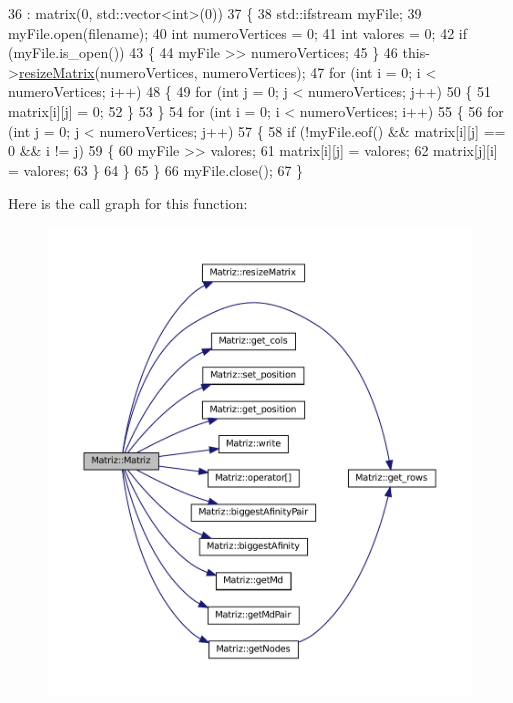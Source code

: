 \begin{DoxyCode}
36                              : matrix(0, std::vector<int>(0))
37   \{
38     std::ifstream myFile;
39     myFile.open(filename);
40     \textcolor{keywordtype}{int} numeroVertices = 0;
41     \textcolor{keywordtype}{int} valores = 0;
42     \textcolor{keywordflow}{if} (myFile.is\_open())
43     \{
44       myFile >> numeroVertices;
45     \}
46     this->\hyperlink{classMatriz_aa929f933e9088dc0efecaa9a46d555d9}{resizeMatrix}(numeroVertices, numeroVertices);
47     \textcolor{keywordflow}{for} (\textcolor{keywordtype}{int} i = 0; i < numeroVertices; i++)
48     \{
49       \textcolor{keywordflow}{for} (\textcolor{keywordtype}{int} j = 0; j < numeroVertices; j++)
50       \{
51         matrix[i][j] = 0;
52       \}
53     \}
54     \textcolor{keywordflow}{for} (\textcolor{keywordtype}{int} i = 0; i < numeroVertices; i++)
55     \{
56       \textcolor{keywordflow}{for} (\textcolor{keywordtype}{int} j = 0; j < numeroVertices; j++)
57       \{
58         \textcolor{keywordflow}{if} (!myFile.eof() && matrix[i][j] == 0 && i != j)
59         \{
60           myFile >> valores;
61           matrix[i][j] = valores;
62           matrix[j][i] = valores;
63         \}
64       \}
65     \}
66     myFile.close();
67   \}
\end{DoxyCode}
Here is the call graph for this function\+:\nopagebreak
\begin{figure}[H]
\begin{center}
\leavevmode
\includegraphics[width=350pt]{classMatriz_a388709cfee356a0c78b66e3f538e9318_cgraph}
\end{center}
\end{figure}


